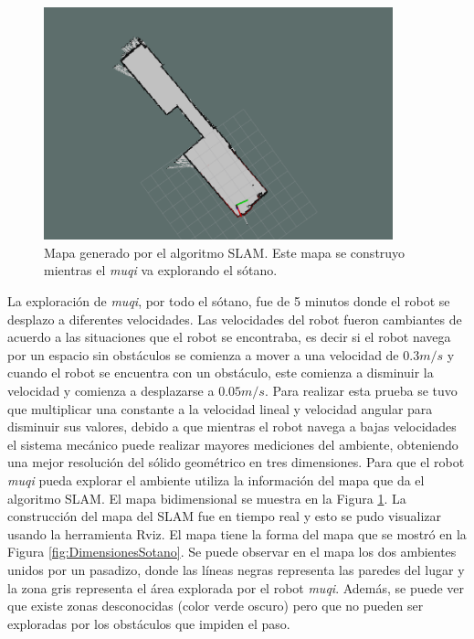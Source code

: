 \begin{figure}
  \centering \footnotesize
  \includegraphics[width=0.90\textwidth]{images/2DSotanoSLAM.png}
  \captionsetup{font=footnotesize}
  \caption{Mapa generado por el algoritmo SLAM. Este mapa se construyo mientras el
  \textit{muqi} va explorando el sótano.}
  \label{fig:slamSotano}
\end{figure}

La exploración de \textit{muqi}, por todo el sótano, fue de 5 minutos donde el robot se
desplazo a diferentes velocidades. Las velocidades del robot fueron cambiantes de acuerdo 
a las situaciones que el robot se encontraba, es decir si el robot navega por un espacio 
sin obstáculos se comienza a mover a una velocidad de $0.3 m/s$ y cuando el robot 
se encuentra con un obstáculo, este comienza a disminuir la velocidad y comienza a
desplazarse a $0.05 m/s$. Para realizar esta prueba se tuvo que multiplicar una constante 
a la velocidad lineal y velocidad angular para disminuir sus valores, debido a que mientras 
el robot navega a bajas velocidades el sistema mecánico puede realizar mayores mediciones 
del ambiente, obteniendo una mejor resolución del sólido geométrico en tres dimensiones. 
Para que el robot \textit{muqi} pueda explorar el ambiente utiliza la información del mapa 
que da el algoritmo SLAM. El mapa bidimensional se muestra en la Figura \ref{fig:slamSotano}. 
La construcción del mapa del SLAM fue en tiempo real y esto se pudo visualizar usando la 
herramienta Rviz. El mapa tiene la forma del mapa que se mostró en la Figura 
\ref{fig:DimensionesSotano}. Se puede observar en el mapa los dos ambientes unidos por un 
pasadizo, donde las líneas negras representa las paredes del lugar y la zona gris representa 
el área explorada por el robot \textit{muqi}. Además, se puede ver que existe zonas 
desconocidas (color verde oscuro) pero que no pueden ser exploradas por los obstáculos que 
impiden el paso.



